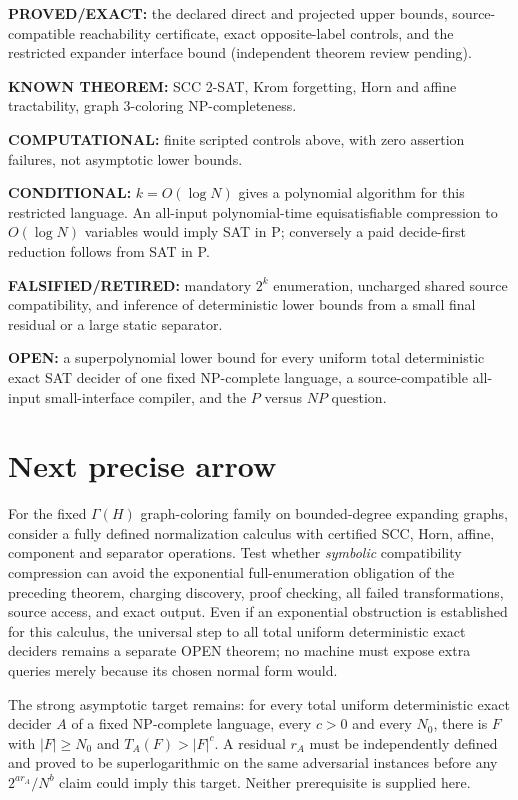 \documentclass[11pt]{article}
\begin{document}
\noindent\textbf{PROVED/EXACT:} the declared direct and projected upper bounds, source-compatible reachability certificate, exact opposite-label controls, and the restricted expander interface bound (independent theorem review pending).

\noindent\textbf{KNOWN THEOREM:} SCC 2-SAT, Krom forgetting, Horn and affine tractability, graph 3-coloring NP-completeness.

\noindent\textbf{COMPUTATIONAL:} finite scripted controls above, with zero assertion failures, not asymptotic lower bounds.

\noindent\textbf{CONDITIONAL:} $k=O(\log N)$ gives a polynomial algorithm for this restricted language. An all-input polynomial-time equisatisfiable compression to $O(\log N)$ variables would imply SAT in P; conversely a paid decide-first reduction follows from SAT in P.

\noindent\textbf{FALSIFIED/RETIRED:} mandatory $2^k$ enumeration, uncharged shared source compatibility, and inference of deterministic lower bounds from a small final residual or a large static separator.

\noindent\textbf{OPEN:} a superpolynomial lower bound for every uniform total deterministic exact SAT decider of one fixed NP-complete language, a source-compatible all-input small-interface compiler, and the $P$ versus $NP$ question.

\section{Next precise arrow}
For the fixed $\Gamma(H)$ graph-coloring family on bounded-degree expanding graphs, consider a fully defined normalization calculus with certified SCC, Horn, affine, component and separator operations. Test whether \emph{symbolic} compatibility compression can avoid the exponential full-enumeration obligation of the preceding theorem, charging discovery, proof checking, all failed transformations, source access, and exact output. Even if an exponential obstruction is established for this calculus, the universal step to all total uniform deterministic exact deciders remains a separate OPEN theorem; no machine must expose extra queries merely because its chosen normal form would.

The strong asymptotic target remains: for every total uniform deterministic exact decider $A$ of a fixed NP-complete language, every $c>0$ and every $N_0$, there is $F$ with $|F|\ge N_0$ and $T_A(F)>|F|^c$. A residual $r_A$ must be independently defined and proved to be superlogarithmic on the same adversarial instances before any $2^{ar_A}/N^b$ claim could imply this target. Neither prerequisite is supplied here.
\end{document}
